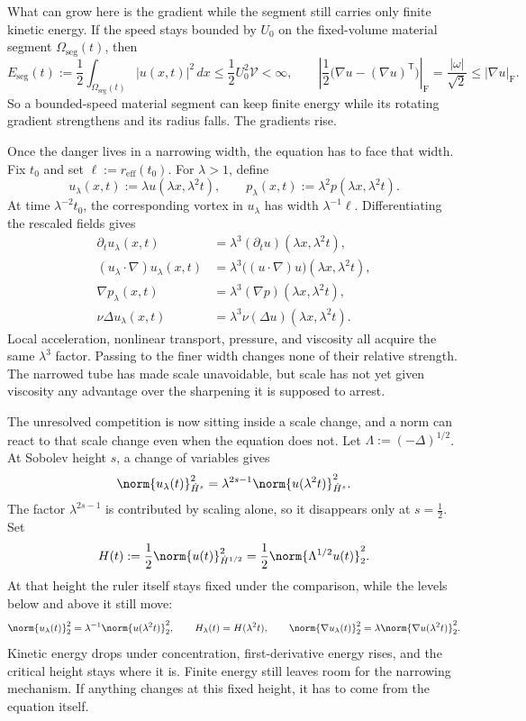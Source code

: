 What can grow here is the gradient while the segment still carries only finite kinetic energy. If the speed stays bounded by \(U_0\) on the fixed-volume material segment \(\Omega_{\mathrm{seg}}(t)\), then
\[
  E_{\mathrm{seg}}(t)
  :=
  \frac12\int_{\Omega_{\mathrm{seg}}(t)}|u(x,t)|^2\,dx
  \leq
  \frac12U_0^2\mathcal V
  <
  \infty,
  \qquad
  \left|\frac12\bigl(\nabla u-(\nabla u)^{\mathsf T}\bigr)\right|_{\mathrm F}
  =
  \frac{|\omega|}{\sqrt2}
  \leq
  |\nabla u|_{\mathrm F}.
\]
So a bounded-speed material segment can keep finite energy while its rotating gradient strengthens and its radius falls. The gradients rise.


Once the danger lives in a narrowing width, the equation has to face that width. Fix \(t_0\) and set \(\ell:=r_{\mathrm{eff}}(t_0)\). For \(\lambda>1\), define
\[
  u_\lambda(x,t)
  :=
  \lambda u(\lambda x,\lambda^2t),
  \qquad
  p_\lambda(x,t)
  :=
  \lambda^2p(\lambda x,\lambda^2t).
\]
At time \(\lambda^{-2}t_0\), the corresponding vortex in \(u_\lambda\) has width \(\lambda^{-1}\ell\). Differentiating the rescaled fields gives
\[
\begin{aligned}
  \partial_tu_\lambda(x,t)
  &=
  \lambda^3(\partial_tu)(\lambda x,\lambda^2t),
  \\
  (u_\lambda\cdot\nabla)u_\lambda(x,t)
  &=
  \lambda^3\bigl((u\cdot\nabla)u\bigr)(\lambda x,\lambda^2t),
  \\
  \nabla p_\lambda(x,t)
  &=
  \lambda^3(\nabla p)(\lambda x,\lambda^2t),
  \\
  \nu\Delta u_\lambda(x,t)
  &=
  \lambda^3\nu(\Delta u)(\lambda x,\lambda^2t).
\end{aligned}
\]
Local acceleration, nonlinear transport, pressure, and viscosity all acquire the same \(\lambda^3\) factor. Passing to the finer width changes none of their relative strength. The narrowed tube has made scale unavoidable, but scale has not yet given viscosity any advantage over the sharpening it is supposed to arrest.


The unresolved competition is now sitting inside a scale change, and a norm can react to that scale change even when the equation does not. Let \(\Lambda:=(-\Delta)^{1/2}\). At Sobolev height \(s\), a change of variables gives
\[
  \norm{u_\lambda(t)}_{\dot H^s}^2
  =
  \lambda^{2s-1}
  \norm{u(\lambda^2t)}_{\dot H^s}^2.
\]
The factor \(\lambda^{2s-1}\) is contributed by scaling alone, so it disappears only at \(s=\tfrac12\). Set
\[
  H(t)
  :=
  \frac12\norm{u(t)}_{\dot H^{1/2}}^2
  =
  \frac12\norm{\Lambda^{1/2}u(t)}_2^2.
\]
At that height the ruler itself stays fixed under the comparison, while the levels below and above it still move:
\[
  \norm{u_\lambda(t)}_2^2
  =
  \lambda^{-1}\norm{u(\lambda^2t)}_2^2,
  \qquad
  H_\lambda(t)=H(\lambda^2t),
  \qquad
  \norm{\nabla u_\lambda(t)}_2^2
  =
  \lambda\norm{\nabla u(\lambda^2t)}_2^2.
\]
Kinetic energy drops under concentration, first-derivative energy rises, and the critical height stays where it is. Finite energy still leaves room for the narrowing mechanism. If anything changes at this fixed height, it has to come from the equation itself.

